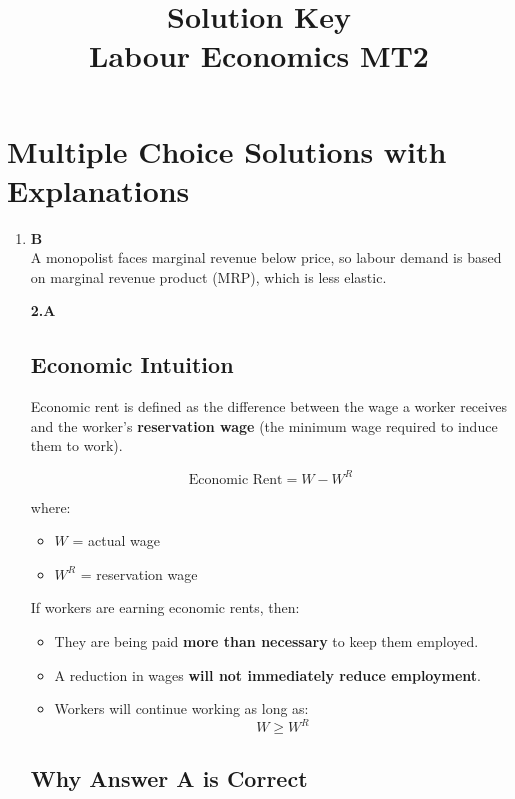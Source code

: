 \documentclass[12pt]{article}
\begin{document}
\title{\textbf{Solution Key}\\
Labour Economics MT2}
\date{}
\maketitle

\section*{Multiple Choice Solutions with Explanations}

\begin{enumerate}

\item \textbf{B} \\
A monopolist faces marginal revenue below price, so labour demand is based on marginal revenue product (MRP), which is less elastic.



\textbf{2.A}

\subsection*{Economic Intuition}

Economic rent is defined as the difference between the wage a worker receives and the worker’s \textbf{reservation wage} (the minimum wage required to induce them to work).

\[
\text{Economic Rent} = W - W^{R}
\]

where:
\begin{itemize}
    \item \(W\) = actual wage
    \item \(W^{R}\) = reservation wage
\end{itemize}


If workers are earning economic rents, then:

\begin{itemize}
    \item They are being paid \textbf{more than necessary} to keep them employed.
    \item A reduction in wages \textbf{will not immediately reduce employment}.
    \item Workers will continue working as long as:
    \[
    W \geq W^{R}
    \]
\end{itemize}

\subsection*{Why Answer A is Correct}


\end{enumerate}
\end{document}
